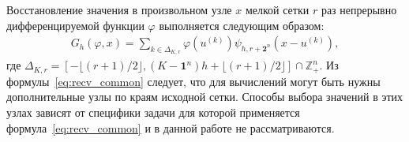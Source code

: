 Восстановление значения в произвольном  узле $x$    мелкой сетки %
$r$ раз непрерывно дифференцируемой функции $\varphi$
выполняется следующим образом: 
\begin{gather}
  \label{eq:recv_common}
  G_h(\varphi, x) = \sum_{k\in  \Delta_{K,r}}
   \varphi(u^{(k)})
   \psi_{h, r+\mathbf{2}^n}(x-u^{(k)}),%
 \end{gather}
 где $ \Delta_{K,r}=\left[-\lfloor{(r+1)/2}\rfloor,
   (K-\mathbf{1}^n)h+\lfloor{(r+1)/2}\rfloor\right]\cap\mathbb{Z}_+^n$.
Из формулы~\eqref{eq:recv_common} следует, что для вычислений
могут быть нужны дополнительные
узлы по краям исходной сетки.
Способы выбора значений в этих узлах зависят
от специфики задачи для которой применяется формула~\eqref{eq:recv_common}  
и в данной работе не рассматриваются.

\begin{comment}

  -->Перенесено в начало!
 
Будем полагать, что $K$ узлов в которых известны значения функции $\varphi$
расположены на отрезке $[0, K-1]$ с единичным шагом ($h=1$).
Сетку с известными значениями в узлах будем называть \textit{крупной сеткой}.
Требуется вычислить значения 
в $M$ узлах,
равномерно расположенных на исходном отрезке,
где $N$ --- произвольное натуральное число.
Сетку размером $M = N(K-1) + K$ будем называть
\textit{мелкой сеткой}.
Обозначим $N^* = N+1$.
В этих обозначениях количество узлов мелкой сетки $M = N^* (K-1) + 1$.


\end{comment}



